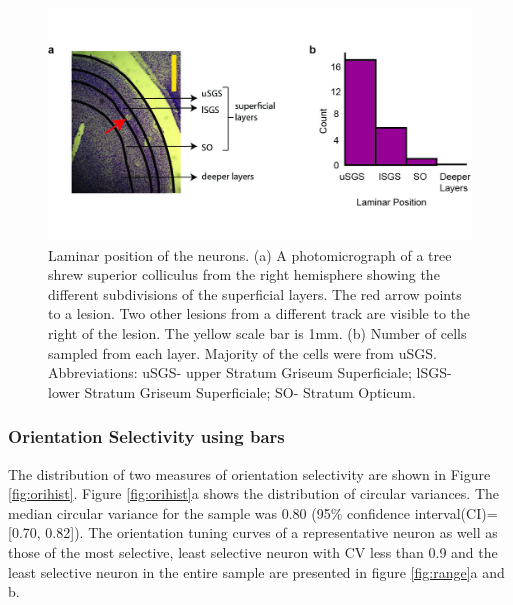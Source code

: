 	\begin{figure}[H]
		
		\includegraphics[width=\linewidth]{superiorcolliculus/anatpos.jpg}
		\caption{Laminar position of the neurons. (a) A photomicrograph of a tree shrew superior colliculus from the right hemisphere showing the different subdivisions of the superficial layers. The red arrow points to a lesion. Two other lesions from a different track are visible to the right of the lesion. The yellow scale bar is 1mm. (b) Number of cells sampled from each layer. Majority of the cells were from uSGS. Abbreviations: uSGS- upper Stratum Griseum Superficiale; lSGS- lower Stratum Griseum Superficiale; SO- Stratum Opticum.}
		\label{fig:anatpos}
	\end{figure}
	
	
	
	\subsubsection{Orientation Selectivity using bars}
	

The distribution of two measures of orientation selectivity are shown in
Figure \ref{fig:orihist}. Figure \ref{fig:orihist}a shows the distribution of circular variances. The
median circular variance for the sample was 0.80 (95\% confidence
interval(CI)= {[}0.70, 0.82{]}). The orientation tuning curves of a
representative neuron as well as those of the most selective, least
selective neuron with CV less than 0.9 and the least selective neuron in
the entire sample are presented in figure \ref{fig:range}a and b.

